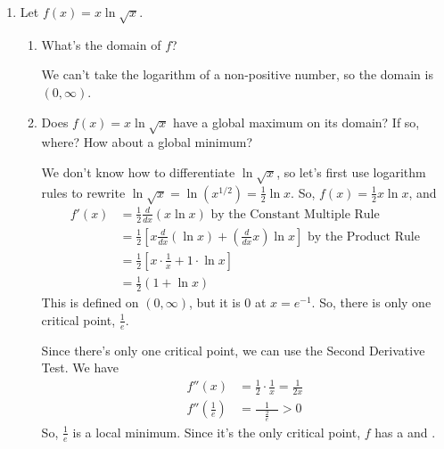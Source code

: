 \documentclass{article}
\begin{document}
\begin{enumerate}[resume]
\begin{enumerate}
  \end{enumerate}

\item  

  Let $f(x) = x \ln \sqrt{x}$.
  \begin{enumerate}
  \item
    \begin{problem}[0.5in]
      What's the domain of $f$? 
    \end{problem}

    \begin{solution}
      We can't take the logarithm of a non-positive number, so the
      domain is $(0, \infty)$.
    \end{solution}

  \item

    \begin{problem}[\stretch{2}]
      Does $f(x) = x \ln \sqrt{x}$ have a global maximum on its domain? If so, where? How about a global minimum? 
    \end{problem}

    \begin{solution} 
      We don't know how to differentiate $\ln \sqrt{x}$, so let's first use logarithm rules to rewrite $\ln \sqrt{x} = \ln \left( x^{1/2} \right) = \frac{1}{2} \ln x$. So, $f(x) = \frac{1}{2} x \ln x$, and
      \begin{align*}
        f'(x) &= \frac{1}{2} \frac{d}{dx} (x \ln x) \text{ by the Constant Multiple Rule} \\
        &= \frac{1}{2} \left[ x \frac{d}{dx} (\ln x) + \left( \frac{d}{dx} x \right) \ln x \right] \text{ by the Product Rule} \\
        &= \frac{1}{2} \left[ x \cdot \frac{1}{x} + 1 \cdot \ln x \right] \\
        &= \frac{1}{2} \left( 1 + \ln x \right)
      \end{align*}
      This is defined on $(0, \infty)$, but it is 0 at $x = e^{-1}$. So, there is only one critical point, $\frac{1}{e}$.

      Since there's only one critical point, we can use the Second Derivative Test. We have
      \begin{align*}
        f''(x) &= \frac{1}{2} \cdot \frac{1}{x} = \frac{1}{2x} \\
        f'' \left( \frac{1}{e} \right) &= \frac{1}{\quad \frac{2}{e} \quad} > 0
      \end{align*}
      So, $\frac{1}{e}$ is a local minimum. Since it's the only critical point, $f$ has a  and
      .
    \end{solution}

  \end{enumerate}

\end{enumerate}
\end{document}
